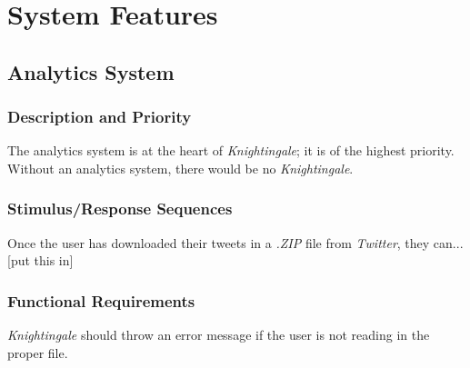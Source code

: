 \documentclass[a4paper, 12pt]{article}
\begin{document}
\section{System Features} \label{sec:sysfeat}
\subsection{Analytics System} \label{sec:analytics}
\subsubsection{Description and Priority} \label{description}
\begin{adjustwidth}{3em}{0pt}
The analytics system is at the heart of \textit{Knightingale}; it is of the highest priority. Without an analytics system, there would be no \textit{Knightingale}.
\end{adjustwidth}

\subsubsection{Stimulus/Response Sequences} \label{sec:stimulus}
\begin{adjustwidth}{3em}{0pt}
Once the user has downloaded their tweets in a \textit{.ZIP} file from \textit{Twitter}, they can...[put this in]
\end{adjustwidth}

\subsubsection{Functional Requirements} \label{sec:functional}
\begin{adjustwidth}{3em}{0pt}
\textit{Knightingale} should throw an error message if the user is not reading in the proper file.
\end{adjustwidth}
\end{document}
